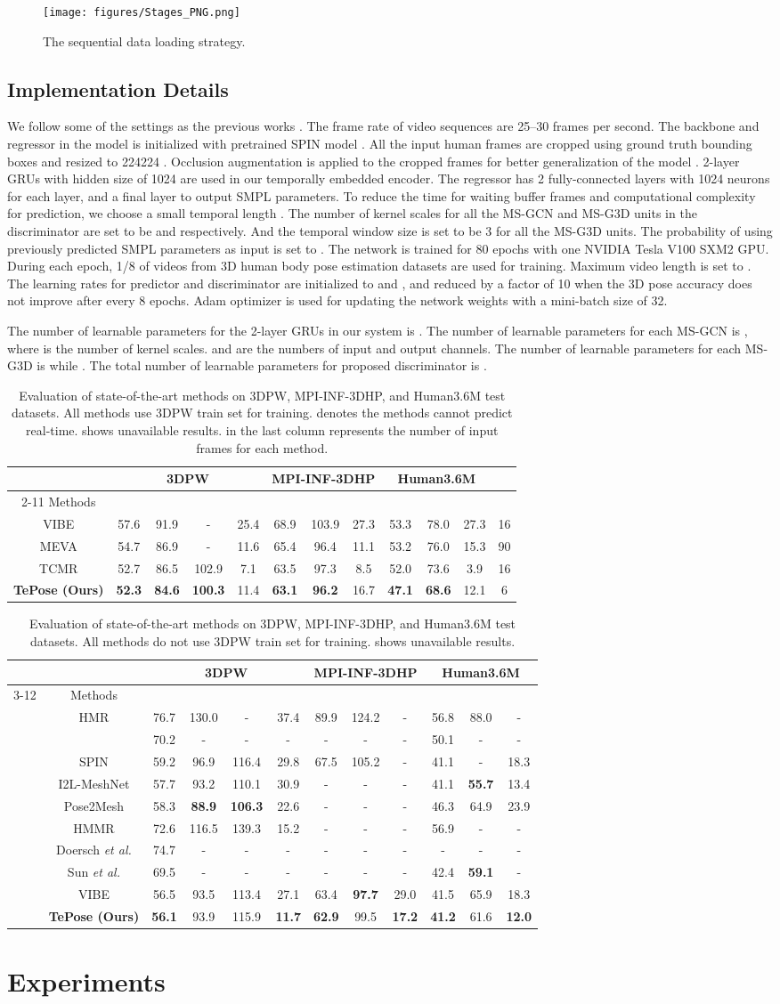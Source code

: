 \documentclass[10pt,twocolumn,letterpaper]{article}
\newcommand{\stages}{
\begin{figure}
  \centering
  \texttt{[image: figures/Stages\_PNG.png]}
  \caption{The sequential data loading strategy.}
  \label{fig:stages}
\end{figure}
}
\newcommand{\tabrescomparison}{
\begin{table*}[t]
\centering
{\begin{footnotesize}
\setlength\tabcolsep{3pt}
\begin{tabular}{c|c c c c|c c c|c c c|c}
\toprule
& \multicolumn{4}{c}{3DPW} 
 & \multicolumn{3}{c}{MPI-INF-3DHP}
 & \multicolumn{3}{c}{Human3.6M}
\\
\cmidrule(r){2-11}
Methods
& \text{PA-MPJPE }
& \text{MPJPE }
& \text{MPVPE }
& \text{Accel }
& \text{PA-MPJPE }
& \text{MPJPE }
& \text{Accel }
& \text{PA-MPJPE }
& \text{MPJPE }
& \text{Accel }
& 
\\ 
\midrule
VIBE \cite{kocabas2020vibe}
& 57.6 & 91.9 & - & 25.4 & 68.9 & 103.9 & 27.3 & 53.3 & 78.0 & 27.3 & 16
\\
\cellcolor{Gray}MEVA \cite{luo20203d}
& \cellcolor{Gray}54.7 
& \cellcolor{Gray}86.9 
& \cellcolor{Gray}- 
& \cellcolor{Gray}11.6 
& \cellcolor{Gray}65.4 
& \cellcolor{Gray}96.4 
& \cellcolor{Gray}11.1 
& \cellcolor{Gray}53.2 
& \cellcolor{Gray}76.0 
& \cellcolor{Gray}15.3
& \cellcolor{Gray}90
\\
TCMR \cite{choi2021beyond}
& 52.7 & 86.5 & 102.9 & 7.1 & 63.5 & 97.3 & 8.5 & 52.0 & 73.6 & 3.9 & 16
\\
\textbf{TePose (Ours)}
& \cellcolor{Gray}\textbf{52.3} 
& \cellcolor{Gray}\textbf{84.6} 
& \cellcolor{Gray}\textbf{100.3} 
& \cellcolor{Gray}11.4 
& \cellcolor{Gray}\textbf{63.1}
& \cellcolor{Gray}\textbf{96.2}
& \cellcolor{Gray}16.7
& \cellcolor{Gray}\textbf{47.1}
& \cellcolor{Gray}\textbf{68.6}
& \cellcolor{Gray}12.1
& \cellcolor{Gray}6
\\
\bottomrule
\end{tabular}
\end{footnotesize}
}
\caption{Evaluation of state-of-the-art methods on 3DPW, MPI-INF-3DHP, and Human3.6M test datasets. All methods use 3DPW train set for training.  denotes the methods cannot predict real-time.  shows unavailable results.  in the last column represents the number of input frames for each method.} 
\label{tab:tabrescomparison}
\end{table*}
}
\newcommand{\tabrescomparisonNoPW}{
\begin{table*}[t]
\centering
{\begin{footnotesize}
\setlength\tabcolsep{3pt}
\begin{tabular}{c c|c c c c|c c c|c c c}
\toprule
& & \multicolumn{4}{c}{3DPW} 
 & \multicolumn{3}{c}{MPI-INF-3DHP}
 & \multicolumn{3}{c}{Human3.6M}
\\
\cmidrule(r){3-12}
 & Methods
& \text{PA-MPJPE }
& \text{MPJPE }
& \text{MPVPE }
& \text{Accel }
& \text{PA-MPJPE }
& \text{MPJPE }
& \text{Accel }
& \text{PA-MPJPE }
& \text{MPJPE }
& \text{Accel }
\\ 
\midrule
\multirow{5}{*}{\rotatebox[origin=c]{90}{Frame-based}}
& HMR \cite{kanazawa2018end}
& 76.7 & 130.0 & - & 37.4 & 89.9 & 124.2 & - & 56.8 & 88.0 & -
\\
& \cellcolor{Gray}{GraphCMR \cite{omran2018neural}}
& \cellcolor{Gray}70.2 
& \cellcolor{Gray}- 
& \cellcolor{Gray}- 
& \cellcolor{Gray}- 
& \cellcolor{Gray}- 
& \cellcolor{Gray}- 
& \cellcolor{Gray}- 
& \cellcolor{Gray}50.1 
& \cellcolor{Gray}- 
& \cellcolor{Gray}-
\\
& SPIN \cite{kolotouros2019learning}
& 59.2 & 96.9 & 116.4 & 29.8 & 67.5 & 105.2 & - & 41.1 & - & 18.3
\\
& \cellcolor{Gray}I2L-MeshNet \cite{moon2020i2l}
& \cellcolor{Gray}57.7 
& \cellcolor{Gray}93.2 
& \cellcolor{Gray}110.1 
& \cellcolor{Gray}30.9 
& \cellcolor{Gray}- 
& \cellcolor{Gray}- 
& \cellcolor{Gray}- 
& \cellcolor{Gray}41.1 
& \cellcolor{Gray}\textbf{55.7} 
& \cellcolor{Gray}13.4
\\
& Pose2Mesh \cite{choi2020pose2mesh}
& 58.3 & \textbf{88.9} & \textbf{106.3} & 22.6 & - & - & - & 46.3 & 64.9 & 23.9
\\
\midrule
\multirow{6}{*}{\rotatebox[origin=c]{90}{Temporal}}
& \cellcolor{Gray}HMMR \cite{kanazawa2019learning}
& \cellcolor{Gray}72.6 
& \cellcolor{Gray}116.5 
& \cellcolor{Gray}139.3 
& \cellcolor{Gray}15.2 
& \cellcolor{Gray}- 
& \cellcolor{Gray}- 
& \cellcolor{Gray}- 
& \cellcolor{Gray}56.9 
& \cellcolor{Gray}- 
& \cellcolor{Gray}-
\\
& Doersch \textit{et al.} \cite{doersch2019sim2real}
& 74.7 & - & - & - & - & - & - & - & - & -
\\
& \cellcolor{Gray}Sun \textit{et al.} \cite{sun2019human}
& \cellcolor{Gray}69.5 
& \cellcolor{Gray}- 
& \cellcolor{Gray}- 
& \cellcolor{Gray}- 
& \cellcolor{Gray}- 
& \cellcolor{Gray}- 
& \cellcolor{Gray}- 
& \cellcolor{Gray}42.4 
& \cellcolor{Gray}\textbf{59.1} 
& \cellcolor{Gray}-
\\
& VIBE \cite{kocabas2020vibe}
& 56.5 & 93.5 & 113.4 & 27.1 & 63.4 & \textbf{97.7} & 29.0 & 41.5 & 65.9 & 18.3
\\
& \cellcolor{Gray}\textbf{TePose (Ours)}
& \cellcolor{Gray}\textbf{56.1} 
& \cellcolor{Gray}93.9 
& \cellcolor{Gray}115.9 
& \cellcolor{Gray}\textbf{11.7}
& \cellcolor{Gray}\textbf{62.9} 
& \cellcolor{Gray}99.5 
& \cellcolor{Gray}\textbf{17.2} 
& \cellcolor{Gray}\textbf{41.2} 
& \cellcolor{Gray}61.6 
& \cellcolor{Gray}\textbf{12.0}
\\
\bottomrule
\end{tabular}
\end{footnotesize}
}
\caption{Evaluation of state-of-the-art methods on 3DPW, MPI-INF-3DHP, and Human3.6M test datasets. All methods do not use
3DPW \cite{von2018recovering} train set for training.  shows unavailable results.} 
\label{tab:tabrescomparisonNoPW}
\end{table*}
}
\begin{document}
\stages


\subsection{Implementation Details}
We follow some of the settings as the previous works \cite{kocabas2020vibe,choi2021beyond}. The frame rate of video sequences are 25--30 frames per second. The backbone and regressor in the model is initialized with pretrained SPIN model \cite{kolotouros2019learning}. All the input human frames are cropped using ground truth bounding boxes and resized to 224224 \cite{kanazawa2018end,kocabas2020vibe,kolotouros2019learning,kolotouros2019convolutional}. Occlusion augmentation is applied to the cropped frames for better generalization of the model \cite{sarandi2018robust}. 2-layer GRUs \cite{cho2014learning} with hidden size of 1024 are used in our temporally embedded encoder. The regressor has 2 fully-connected layers with 1024 neurons for each layer, and a final layer to output SMPL parameters\cite{kolotouros2019learning}. To reduce the time for waiting buffer frames and computational complexity for prediction, we choose a small temporal length . The number of kernel scales for all the MS-GCN and MS-G3D units in the discriminator are set to be  and  respectively. And the temporal window size  is set to be 3 for all the MS-G3D units. The probability of using previously predicted SMPL parameters as input is set to . The network is trained for 80 epochs with one NVIDIA Tesla V100 SXM2 GPU. During each epoch, 1/8 of videos from 3D human body pose estimation datasets are used for training. Maximum video length  is set to . The learning rates for predictor and discriminator are initialized to  and , and reduced by a factor of 10 when the 3D pose accuracy does not improve after every 8 epochs. Adam optimizer \cite{kingma2014adam} is used for updating the network weights with a mini-batch size of 32.


The number of learnable parameters for the 2-layer GRUs in our system is . The number of learnable parameters for each MS-GCN is , where  is the number of kernel scales.  and  are the numbers of input and output channels. The number of learnable parameters for each MS-G3D is  while . The total number of learnable parameters for proposed discriminator is .


\tabrescomparison
\tabrescomparisonNoPW
\section{Experiments}
\label{others}
\end{document}
